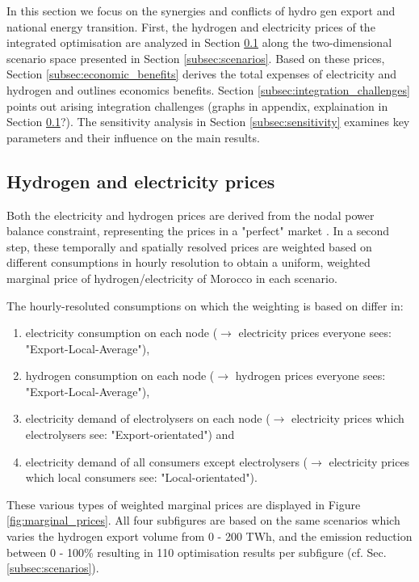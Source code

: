 In this section we focus on the synergies and conflicts of hydro gen export and national energy transition. First, the
hydrogen and electricity prices of the integrated optimisation are analyzed in Section \ref{subsec:results_prices} along the two-dimensional scenario space presented in Section \ref{subsec:scenarios}. Based on these prices, Section \ref{subsec:economic_benefits} derives the total expenses of electricity and hydrogen and outlines economics benefits. Section \ref{subsec:integration_challenges} points out arising integration challenges (graphs in appendix, explaination in Section \ref{subsec:results_prices}?). The sensitivity analysis in Section \ref{subsec:sensitivity} examines key parameters and their influence on the main results.


\subsection{Hydrogen and electricity prices}
\label{subsec:results_prices}

Both the electricity and hydrogen prices are derived from the nodal power balance constraint, representing the prices in a "perfect" market \cite{Zeyen2022}.
In a second step, these temporally and spatially resolved prices are weighted based on different consumptions in hourly resolution to obtain a uniform, weighted marginal price of hydrogen/electricity of Morocco in each scenario.

The hourly-resoluted consumptions on which the weighting is based on differ in:
\begin{enumerate}
    \item electricity consumption on each node ($\rightarrow$ electricity prices everyone sees: "Export-Local-Average"),
    \item hydrogen consumption on each node ($\rightarrow$ hydrogen prices everyone sees: "Export-Local-Average"),
    \item electricity demand of electrolysers on each node ($\rightarrow$ electricity prices which electrolysers see: "Export-orientated") and
    \item electricity demand of all consumers except electrolysers ($\rightarrow$ electricity prices which local consumers see: "Local-orientated").
\end{enumerate}

These various types of weighted marginal prices are displayed in Figure \ref{fig:marginal_prices}. All four subfigures are based on the same scenarios which varies the hydrogen export volume from 0 - 200 TWh, and the emission reduction between 0 - 100\% resulting in 110 optimisation results per subfigure (cf. Sec. \ref{subsec:scenarios}).

